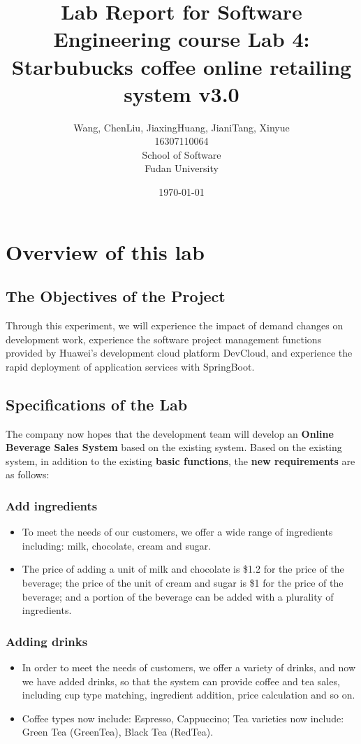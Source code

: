 \documentclass[a4paper]{report}
\title{Lab Report for Software Engineering course \newline
 Lab 4: Starbubucks coffee online retailing system v3.0}
\author{Wang, Chen\qquad Liu, Jiaxing\qquad Huang, Jiani\qquad Tang, Xinyue \\
16307110064\qquad17302010049\qquad 17302010063\qquad 16307110476 \\
School of Software\\
Fudan University
}
\date{\today}
\begin{document}
\maketitle

\tableofcontents
\chapter{Overview of this lab}
\section{The Objectives of the Project}
Through this experiment, we will experience the impact of demand changes on development work, experience the software project management functions provided by Huawei's development cloud platform DevCloud, and experience the rapid deployment of application services with SpringBoot.
\section{Specifications of the Lab}
The company now hopes that the development team will develop an \textbf{Online Beverage Sales System} based on the existing system. Based on the existing system, in addition to the existing \textbf{basic functions}, the \textbf{new requirements} are as follows:
\subsection{Add ingredients}
\begin{itemize}
\item
To meet the needs of our customers, we offer a wide range of ingredients including: milk, chocolate, cream and sugar.
\item
The price of adding a unit of milk and chocolate is \$1.2 for the price of the beverage; the price of the unit of cream and sugar is \$1 for the price of the beverage; and a portion of the beverage can be added with a plurality of ingredients.
\end{itemize}
\subsection{Adding drinks}
\begin{itemize}
\item
In order to meet the needs of customers, we offer a variety of drinks, and now we have added drinks, so that the system can provide coffee and tea sales, including cup type matching, ingredient addition, price calculation and so on.
\item
Coffee types now include: Espresso, Cappuccino; Tea varieties now include: Green Tea (GreenTea), Black Tea (RedTea).
\end{itemize}
\end{document}
